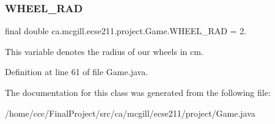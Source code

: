 \subsubsection{\texorpdfstring{W\+H\+E\+E\+L\+\_\+\+R\+AD}{WHEEL\_RAD}}
{\footnotesize\ttfamily final double ca.\+mcgill.\+ecse211.\+project.\+Game.\+W\+H\+E\+E\+L\+\_\+\+R\+AD = 2.\hspace{0.3cm}{\ttfamily [static]}}

This variable denotes the radius of our wheels in cm. 

Definition at line 61 of file Game.\+java.



The documentation for this class was generated from the following file\+:\begin{DoxyCompactItemize}
\item 
/home/ccc/\+Final\+Project/src/ca/mcgill/ecse211/project/Game.\+java\end{DoxyCompactItemize}
